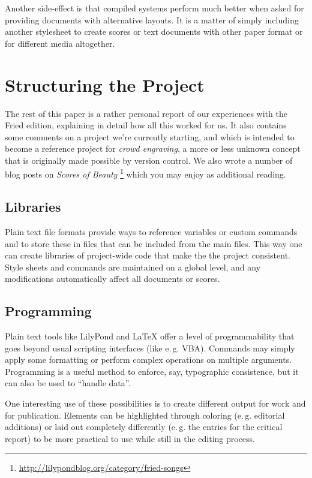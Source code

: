\documentclass[11pt,a4paper]{article}
\begin{document}
Another side-effect is that compiled systems perform much better when asked for providing
documents with alternative layouts. It is a matter of simply including another stylesheet
to create scores or text documents with other paper format or for different media altogether.

\section{Structuring the Project}

The rest of this paper is a rather personal report of our experiences with the Fried
edition, explaining in detail how all this worked for us.  It also contains
some comments on a project we're currently starting, and which is intended to become
a reference project for \emph{crowd engraving}, a more or less unknown concept that is
originally made possible by version control. We also wrote a number of blog posts on
\emph{Scores of Beauty}%
\footnote{\url{http://lilypondblog.org/category/fried-songs}}
which you may enjoy as additional reading.


\subsection{Libraries}
Plain text file formats provide ways to reference variables or custom
commands and to store these in files that can be included from the
main files. This way one can create libraries of project-wide code
that make the the project consistent. Style sheets and commands are
maintained on a global level, and any modifications automatically
affect all documents or scores.

\subsection{Programming}
Plain text tools like LilyPond and \LaTeX{} offer a level of programmability that
goes beyond usual scripting interfaces (like e.\,g. VBA). Commands may simply apply
some formatting or perform complex operations on multiple arguments.
Programming is a useful method to enforce, say, typographic consistence, but it can
also be used to “handle data”.

One interesting use of these possibilities is to create different output for work and for
publication. Elements can be highlighted through coloring (e.\,g. editorial additions)
or laid out completely differently (e.\,g. the entries for the critical report) to be
more practical to use while still in the editing process.
\end{document}
